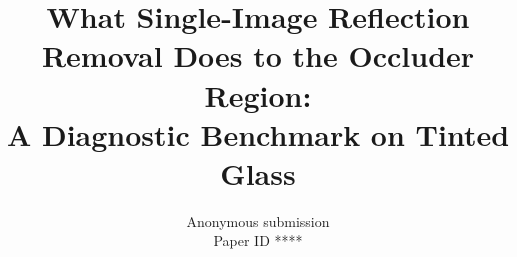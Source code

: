\documentclass[10pt,twocolumn,letterpaper]{article}
\title{What Single-Image Reflection Removal Does to the Occluder Region:\\[2pt]
A Diagnostic Benchmark on Tinted Glass}
\author{Anonymous submission\\Paper ID ****}
\begin{document}
\maketitle










{
    \small
    
    
}
\end{document}

